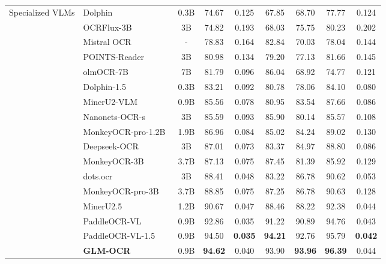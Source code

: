 \begin{table}[t]
{\begin{tabular}{l l c c c c c c c}
\multirow{15}{*}{Specialized VLMs}
& Dolphin~\cite{feng2025dolphin} & 0.3B & 74.67 & 0.125 & 67.85 & 68.70 & 77.77 & 0.124 \\
& OCRFlux-3B~\cite{OCRFlux2025} & 3B & 74.82 & 0.193 & 68.03 & 75.75 & 80.23 & 0.202 \\
& Mistral OCR~\cite{mistral} & - & 78.83 & 0.164 & 82.84 & 70.03 & 78.04 & 0.144 \\
& POINTS-Reader~\cite{liu2025points} & 3B & 80.98 & 0.134 & 79.20 & 77.13 & 81.66 & 0.145 \\
& olmOCR-7B~\cite{poznanski2025olmocr} & 7B & 81.79 & 0.096 & 86.04 & 68.92 & 74.77 & 0.121 \\
& Dolphin-1.5~\cite{feng2025dolphin} & 0.3B & 83.21 & 0.092 & 80.78 & 78.06 & 84.10 & 0.080 \\
& MinerU2-VLM~\cite{Mineru2-pipeline} & 0.9B & 85.56 & 0.078 & 80.95 & 83.54 & 87.66 & 0.086 \\
& Nanonets-OCR-s~\cite{Nanonets-OCR-S} & 3B & 85.59 & 0.093 & 85.90 & 80.14 & 85.57 & 0.108 \\
& MonkeyOCR-pro-1.2B~\cite{li2025monkeyocr} & 1.9B & 86.96 & 0.084 & 85.02 & 84.24 & 89.02 & 0.130 \\
& Deepseek-OCR~\cite{wei2025deepseek} & 3B & 87.01 & 0.073 & 83.37 & 84.97 & 88.80 & 0.086 \\
& MonkeyOCR-3B~\cite{li2025monkeyocr} & 3.7B & 87.13 & 0.075 & 87.45 & 81.39 & 85.92 & 0.129 \\
& dots.ocr~\cite{dotsocr} & 3B & 88.41 & 0.048 & 83.22 & 86.78 & 90.62 & 0.053 \\
& MonkeyOCR-pro-3B~\cite{li2025monkeyocr} & 3.7B & 88.85 & 0.075 & 87.25 & 86.78 & 90.63 & 0.128 \\
& MinerU2.5~\cite{niu2025mineru2} & 1.2B & 90.67 & 0.047 & 88.46 & 88.22 & 92.38 & 0.044 \\
& PaddleOCR-VL~\cite{PaddleOCR-VL} & 0.9B & 92.86 & 0.035 & 91.22 & 90.89 & 94.76 & 0.043 \\
& PaddleOCR-VL-1.5~\cite{PaddleOCR-VL-1.5} & 0.9B & 94.50 & \textbf{0.035} & \textbf{94.21} & 92.76 & 95.79 & \textbf{0.042} \\
\midrule
& \textbf{GLM-OCR} & 0.9B & \textbf{94.62} & 0.040 & 93.90 & \textbf{93.96} & \textbf{96.39} & 0.044 \\
\bottomrule
\end{tabular}}
\label{tab:main_results}
\end{table}